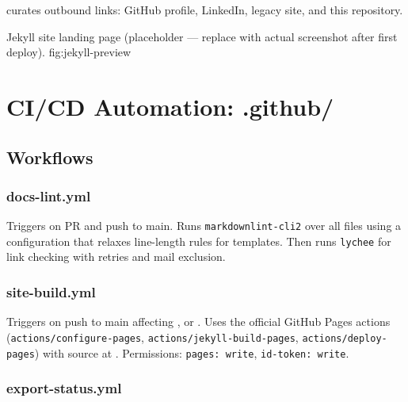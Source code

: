 \documentclass[a4paper,11pt,openany]{report}
\begin{document}
 curates outbound links: GitHub profile, LinkedIn,
legacy site, and this repository.

%
  {Jekyll site landing page (placeholder --- replace with actual screenshot after first deploy).}%
  {fig:jekyll-preview}



\chapter{CI/CD Automation: .github/}
\label{ch:cicd}


\section{Workflows}

\subsection{docs-lint.yml}

Triggers on PR and push to main. Runs \texttt{markdownlint-cli2} over all
 files using a  configuration that
relaxes line-length rules for templates. Then runs \texttt{lychee} for link
checking with retries and mail exclusion.

\subsection{site-build.yml}

Triggers on push to main affecting ,
or . Uses the official GitHub Pages actions
(\texttt{actions/configure-pages}, \texttt{actions/jekyll-build-pages},
\texttt{actions/deploy-pages}) with source at .
Permissions: \texttt{pages: write}, \texttt{id-token: write}.

\subsection{export-status.yml}
\end{document}
